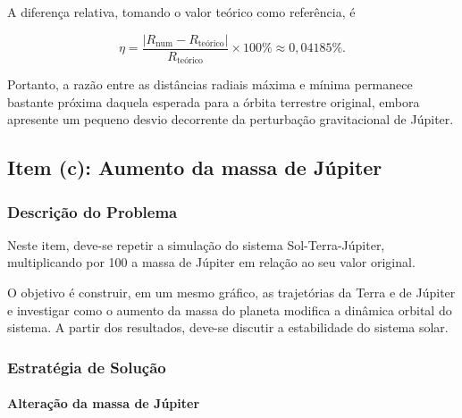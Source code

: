 \documentclass[12pt,a4paper]{article}
\begin{document}
A diferença relativa, tomando o valor teórico como referência, é

\begin{equation}
    \eta=
    \frac{|R_{\mathrm{num}}-R_{\mathrm{teórico}}|}
    {R_{\mathrm{teórico}}}\times100\%
    \approx0,04185\%.
\end{equation}

Portanto, a razão entre as distâncias radiais máxima e mínima permanece bastante próxima daquela esperada para a órbita terrestre original, embora apresente um pequeno desvio decorrente da perturbação gravitacional de Júpiter.

\subsection{Item (c): Aumento da massa de Júpiter}

\subsubsection{Descrição do Problema}

Neste item, deve-se repetir a simulação do sistema Sol-Terra-Júpiter, multiplicando por 100 a massa de Júpiter em relação ao seu valor original.

O objetivo é construir, em um mesmo gráfico, as trajetórias da Terra e de Júpiter e investigar como o aumento da massa do planeta modifica a dinâmica orbital do sistema. A partir dos resultados, deve-se discutir a estabilidade do sistema solar.

\subsubsection{Estratégia de Solução}

\paragraph{Alteração da massa de Júpiter}
\end{document}

